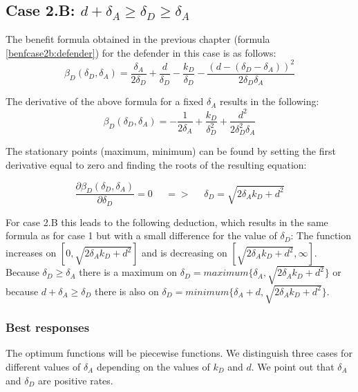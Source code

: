 \subsection*{Case 2.B: $d+\delta_{A} \geq \delta_{D} \geq  \delta_{A} $} 

The benefit formula obtained in the previous chapter  (formula \ref{benfcase2b:defender}) for the defender in this case is as follows:
\begin{equation*}
\beta_{D}(\delta_{D},\delta_{A}) = \dfrac{\delta_{A}}{2\delta_{D}} + \dfrac{d}{\delta_{D}} - \dfrac{k_{D}}{\delta_{D}} - \dfrac{(d-(\delta_{D} - \delta_{A}))^{2}}{2\delta_{D}\delta_{A}}
\end{equation*}

The derivative of the above formula for a fixed $\delta_{A}$ results in the following:
\begin{equation*}
\beta_{D}(\delta_{D},\delta_{A}) =  - \dfrac{1}{2\delta_{A}} + \dfrac{k_{D}}{\delta_{D}^{2}} + \dfrac{d^{2}}{2\delta_{D}^{2}\delta_{A}}
\end{equation*}


The stationary points (maximum, minimum) can be found by setting the first derivative equal to zero and finding the roots of the resulting equation:

\begin{equation*}
\frac{\partial \beta_{D}(\delta_{D},\delta_{A})}{\partial \delta_{D}} =0 ~~~~~~ =>~~~~~~ \delta_{D} = \sqrt{2\delta_{A}k_{D} + d^{2}}
\end{equation*}


For case 2.B this leads to the following deduction, which results in the same formula as for case 1 but with a small difference for the value of $\delta_{D}$: The function increases on $[0, \sqrt{2\delta_{A}k_{D} + d^{2}}]$ and is decreasing on $[\sqrt{2\delta_{A}k_{D} + d^{2}}, \infty]$. Because $\delta_{D} \geq \delta_{A}$ there is a maximum on $\delta_{D} = maximum \{ \delta_{A}, \sqrt{2\delta_{A}k_{D} + d^{2}} \} $ or because $d+\delta_{A} \geq \delta_{D}$ there is also on $\delta_{D} = minimum \{ \delta_{A}+d, \sqrt{2\delta_{A}k_{D} + d^{2}} \} $. \\

\subsubsection{Best responses}
The optimum functions will be piecewise functions. We distinguish three cases for different values of $\delta_{A}$ depending on the values of $k_{D}$ and $d$. 
We point out that $\delta_{A}$ and $\delta_{D}$ are positive rates. 

